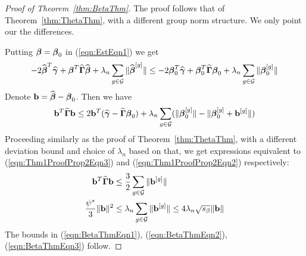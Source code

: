 \documentclass[12pt, letterpaper]{article}
\theoremstyle{definition}
\numberwithin{equation}{section}
\begin{document}
\begin{proof}[Proof of Theorem~\ref{thm:BetaThm}]
The proof follows that of Theorem~\ref{thm:ThetaThm}, with a different group norm structure. We only point our the differences.

Putting ${\boldsymbol{\beta}} = {\boldsymbol{\beta}}_0$ in (\ref{eqn:EstEqn1}) we get
%
$$
-2 \widehat {{\boldsymbol{\beta}}}^T \widehat {{\boldsymbol{\gamma}}} + {\boldsymbol{\beta}}^T \widehat {{\boldsymbol{\Gamma}}} \widehat {{\boldsymbol{\beta}}} + \lambda_n \sum_{g \in {\cal{G}}} \| \widehat {{\boldsymbol{\beta}}}^{[g]}  \| \leq
-2 {\boldsymbol{\beta}}_0^T \widehat {{\boldsymbol{\gamma}}} + {\boldsymbol{\beta}}_0^T \widehat {{\boldsymbol{\Gamma}}} {\boldsymbol{\beta}}_0 + \lambda_n \sum_{g \in {\cal{G}}} \| {\boldsymbol{\beta}}_0^{[g]}  \|
$$
%
Denote ${\bf{b}} = \widehat {{\boldsymbol{\beta}}} - {\boldsymbol{\beta}}_0$. Then we have
%
$$
{\bf{b}}^T \widehat {{\boldsymbol{\Gamma}}} {\bf{b}} \leq 2 {\bf{b}}^T ( \widehat {{\boldsymbol{\gamma}}} - \widehat {{\boldsymbol{\Gamma}}} {\boldsymbol{\beta}}_0 ) + \lambda_n
\sum_{g \in {\cal{G}}} ( \| {\boldsymbol{\beta}}_0^{[g]} \| - \| {\boldsymbol{\beta}}_0^{[g]} + {\bf{b}}^{[g]} \|)
$$
%
Proceeding similarly as the proof of Theorem~\ref{thm:ThetaThm}, with a different deviation bound and choice of $\lambda_n$ based on that, we get expressions equivalent to (\ref{eqn:Thm1ProofProp2Eqn3}) and (\ref{eqn:Thm1ProofProp2Eqn2}) respectively:
%
\begin{align}
{\bf{b}}^T \widehat {{\boldsymbol{\Gamma}}} {\bf{b}} & \leq \frac{3}{2} \sum_{g \in {\cal{G}}} \| {\bf{b}}^{[g]} \| \\
\frac{\psi^*}{3} \| {\bf{b}} \|^2 & \leq \lambda_n \sum_{g \in {\cal{G}}} \| {\bf{b}}^{[g]} \| \leq 4 \lambda_n \sqrt{s_\beta} \| {\bf{b}} \|
\end{align}
%
The bounds in (\ref{eqn:BetaThmEqn1}), (\ref{eqn:BetaThmEqn2}), (\ref{eqn:BetaThmEqn3}) %
follow.

\end{proof}
\end{document}
